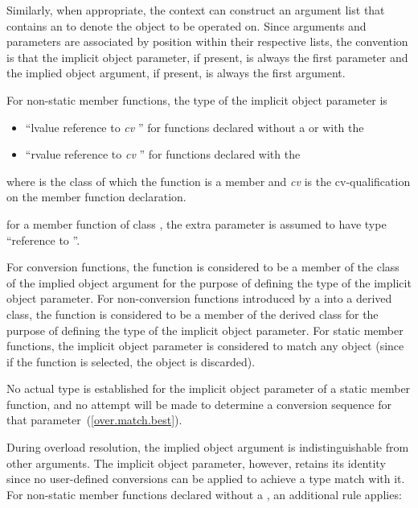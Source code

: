 \pnum
Similarly, when appropriate, the context can construct an
argument list that contains an
to denote
the object to be operated on.
Since arguments and parameters are
associated by position within their respective lists, the
convention is that the implicit object parameter, if present, is
always the first parameter and the implied object argument, if
present, is always the first argument.

\pnum
{}%
%
%
For non-static member functions, the type of the implicit object
parameter is

\begin{itemize}
\item ``lvalue reference to \textit{cv} '' for functions declared
without a  or with the
\tcode{\&} 
\item ``rvalue reference to \textit{cv} '' for functions declared with the
\tcode{\&\&} 
\end{itemize}

where
is the class of which the function is a member and
\textit{cv}
is the cv-qualification on the
member function declaration.
\begin{example}
for a
member
function of class
,
the extra parameter is assumed to have type
``reference to
''.
\end{example}
For conversion functions, the function is considered to be a member of the
class of the implied object argument for the purpose of defining the
type of the implicit object parameter.
For non-conversion functions
introduced by a
into a derived class, the function is
considered to be a member of the derived class for the purpose of defining
the type of the implicit object parameter.
For static member functions, the implicit object parameter is considered
to match any object (since if the function is selected, the object is
discarded).
\begin{note}
No actual type is established for the implicit object parameter
of a static member function, and no attempt will be made to determine a
conversion sequence for that parameter~(\ref{over.match.best}).
\end{note}

\pnum
{}%
During overload resolution, the implied object argument is
indistinguishable from other arguments.
The implicit object
parameter, however, retains its identity since
no user-defined conversions can be applied to achieve a type
match with it.
%
For non-static member functions declared without a ,
an additional rule applies:

